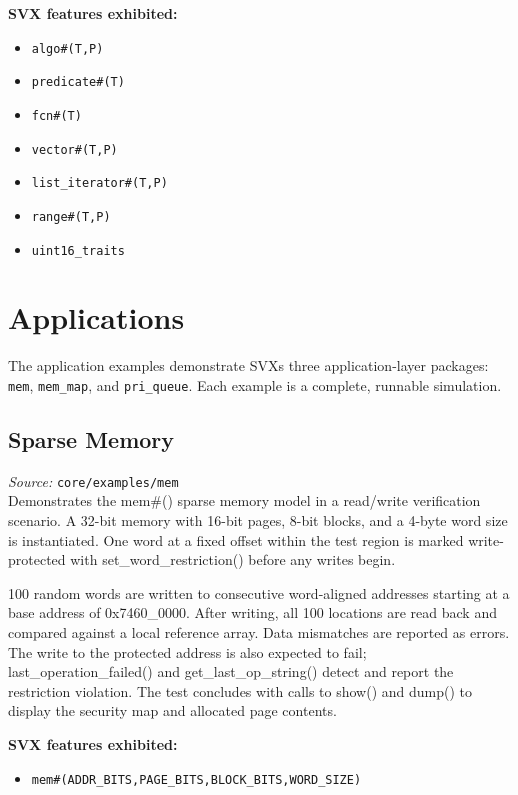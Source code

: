\documentclass[11pt,letterpaper]{report}
\begin{document}
\textbf{SVX features exhibited:}

\begin{itemize}
  \item \texttt{algo\#(T,P)}
  \item \texttt{predicate\#(T)}
  \item \texttt{fcn\#(T)}
  \item \texttt{vector\#(T,P)}
  \item \texttt{list\_iterator\#(T,P)}
  \item \texttt{range\#(T,P)}
  \item \texttt{uint16\_traits}
\end{itemize}
\chapter{Applications}

The application examples demonstrate SVX\textquotesingle s three application-layer packages: \texttt{mem}, \texttt{mem\_map}, and \texttt{pri\_queue}. Each example is a complete, runnable simulation.

\section{Sparse Memory}

\textit{Source:} \texttt{core/examples/mem}\\

Demonstrates the mem\#() sparse memory model in a read/write verification scenario. A 32-bit memory with 16-bit pages, 8-bit blocks, and a 4-byte word size is instantiated. One word at a fixed offset within the test region is marked write-protected with set\_word\_restriction() before any writes begin.

100 random words are written to consecutive word-aligned addresses starting at a base address of 0x7460\_0000. After writing, all 100 locations are read back and compared against a local reference array. Data mismatches are reported as errors. The write to the protected address is also expected to fail; last\_operation\_failed() and get\_last\_op\_string() detect and report the restriction violation. The test concludes with calls to show() and dump() to display the security map and allocated page contents.

\textbf{SVX features exhibited:}

\begin{itemize}
  \item \texttt{mem\#(ADDR\_BITS,PAGE\_BITS,BLOCK\_BITS,WORD\_SIZE)}
\end{itemize}
\end{document}
